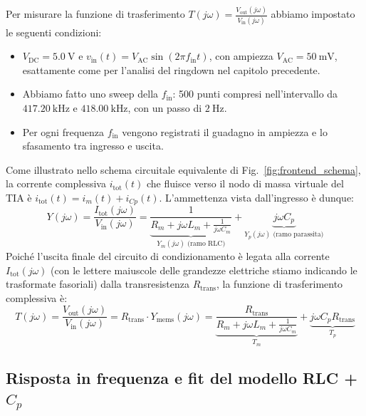 \documentclass[11pt,a4paper]{article}
\begin{document}
\vspace{0.3cm}
\noindent Per misurare la funzione di trasferimento $T(j\omega) = \frac{V_{\text{out}}(j\omega)}{V_{\text{in}}(j\omega)}$ abbiamo impostato le seguenti condizioni:
\begin{itemize}
    \item $V_{\text{DC}} = \SI{5.0}{\volt}$ e $v_{\text{in}}(t) = V_{\text{AC}} \sin(2\pi f_{\text{in}} t)$, con ampiezza $V_{\text{AC}} = \SI{50}{\milli\volt}$, esattamente come per l'analisi del ringdown nel capitolo precedente.
    \item Abbiamo fatto uno sweep della $f_{\text{in}}$: 500 punti compresi nell'intervallo da $\SI{417.20}{\kilo\hertz}$ e $\SI{418.00}{\kilo\hertz}$, con un passo di $\SI{2}{\hertz}$.
    \item Per ogni frequenza $f_{\text{in}}$ vengono registrati il guadagno in ampiezza e lo sfasamento tra ingresso e uscita.
\end{itemize}

\noindent Come illustrato nello schema circuitale equivalente di Fig.~\ref{fig:frontend_schema}, la corrente complessiva $i_{\text{tot}}(t)$ che fluisce verso il nodo di massa virtuale del TIA è $i_{\text{tot}}(t) = i_m(t) + i_{Cp}(t)$. L'ammettenza vista dall'ingresso è dunque:
\begin{equation}
    Y(j\omega) = \frac{I_{\text{tot}}(j\omega)}{V_{\text{in}}(j\omega)} = \underbrace{\frac{1}{R_m + j\omega L_m + \frac{1}{j\omega C_m}}}_{Y_m(j\omega) \text{ (ramo RLC)}} + \underbrace{j\omega C_p}_{Y_{p}(j\omega) \text{ (ramo parassita)}}
\end{equation}
Poiché l'uscita finale del circuito di condizionamento è legata alla corrente $I_{\text{tot}}(j\omega)$ (con le lettere maiuscole delle grandezze elettriche stiamo indicando le trasformate fasoriali) dalla transresistenza $R_{\text{trans}}$, la funzione di trasferimento complessiva è:
\begin{equation}
    \label{eq:trasferimento_totale}
    T(j\omega) = \frac{V_{\text{out}}(j\omega)}{V_{\text{in}}(j\omega)} = R_{\text{trans}} \cdot Y_{\text{mems}}(j\omega) = \underbrace{\frac{R_{\text{trans}}}{R_m + j\omega L_m + \frac{1}{j\omega C_m}}}_{T_m} + \underbrace{j \omega C_p R_{\text{trans}}}_{T_p}
\end{equation}

\newpage

\subsection{Risposta in frequenza e fit del modello RLC + \texorpdfstring{$C_p$}{Cp}}
\label{subsec:bode_completo}
\end{document}

